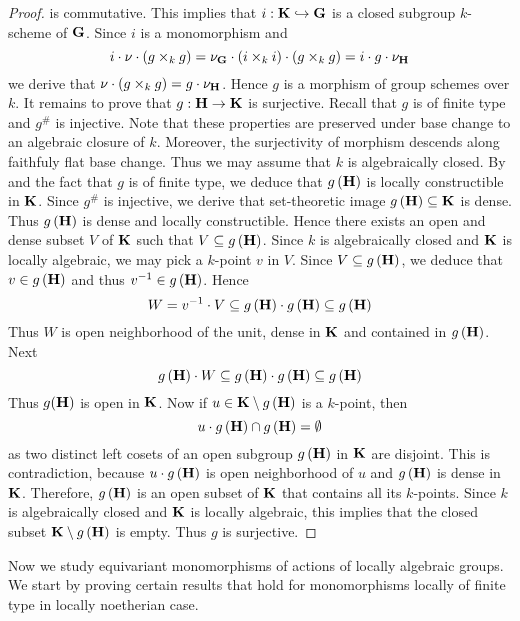 \begin{proof}
is commutative. This implies that $i:\mathbf{K} \hookrightarrow \mathbf{G}$ is a closed subgroup $k$-scheme of $\mathbf{G}$. Since $i$ is a monomorphism and
$$i\cdot \nu \cdot \left(g\times_k g\right) = \nu_{\mathbf{G}}\cdot \left(i\times_k i\right) \cdot \left(g\times_k g\right) = i \cdot g \cdot \nu_{\mathbf{H}}$$
we derive that $\nu \cdot \left(g\times_k g\right) = g\cdot \nu_{\mathbf{H}}$. Hence $g$ is a morphism of group schemes over $k$. It remains to prove that $g:\mathbf{H}\rightarrow \mathbf{K}$ is surjective. Recall that $g$ is of finite type and $g^{\#}$ is injective. Note that these properties are preserved under base change to an algebraic closure of $k$. Moreover, the surjectivity of morphism descends along faithfuly flat base change. Thus we may assume that $k$ is algebraically closed. By {\cite[Theorem 3.4]{Constructibleandlocallyconstructiblesets}} and the fact that $g$ is of finite type, we deduce that $g\left(\mathbf{H}\right)$ is locally constructible in $\mathbf{K}$. Since $g^{\#}$ is injective, we derive that set-theoretic image $g\left(\mathbf{H}\right)\subseteq \mathbf{K}$ is dense. Thus $g\left(\mathbf{H}\right)$ is dense and locally constructible. Hence there exists an open and dense subset $V$ of $\mathbf{K}$ such that $V\subseteq g\left(\mathbf{H}\right)$. Since $k$ is algebraically closed and $\mathbf{K}$ is locally algebraic, we may pick a $k$-point $v$ in $V$. Since $V\subseteq g\left(\mathbf{H}\right)$, we deduce that $v\in g\left(\mathbf{H}\right)$ and thus $v^{-1}\in g\left(\mathbf{H}\right)$. Hence
$$W = v^{-1}\cdot V \subseteq g\left(\mathbf{H}\right)\cdot g\left(\mathbf{H}\right) \subseteq g\left(\mathbf{H}\right)$$
Thus $W$ is open neighborhood of the unit, dense in $\mathbf{K}$ and contained in $g\left(\mathbf{H}\right)$. Next
$$g\left(\mathbf{H}\right)\cdot W \subseteq g\left(\mathbf{H}\right)\cdot g\left(\mathbf{H}\right)\subseteq g\left(\mathbf{H}\right)$$
Thus $g(\mathbf{H})$ is open in $\mathbf{K}$. Now if $u\in \mathbf{K}\setminus g\left(\mathbf{H}\right)$ is a $k$-point, then
$$u\cdot g\left(\mathbf{H}\right)\cap g\left(\mathbf{H}\right) = \emptyset$$
as two distinct left cosets of an open subgroup $g\left(\mathbf{H}\right)$ in $\mathbf{K}$ are disjoint. This is contradiction, because $u\cdot g\left(\mathbf{H}\right)$ is open neighborhood of $u$ and $g\left(\mathbf{H}\right)$ is dense in $\mathbf{K}$. Therefore, $g\left(\mathbf{H}\right)$ is an open subset of $\mathbf{K}$ that contains all its $k$-points. Since $k$ is algebraically closed and $\mathbf{K}$ is locally algebraic, this implies that the closed subset $\mathbf{K}\setminus g\left(\mathbf{H}\right)$ is empty. Thus $g$ is surjective.
\end{proof}
\noindent
Now we study equivariant monomorphisms of actions of locally algebraic groups. We start by proving certain results that hold for monomorphisms locally of finite type in locally noetherian case.

